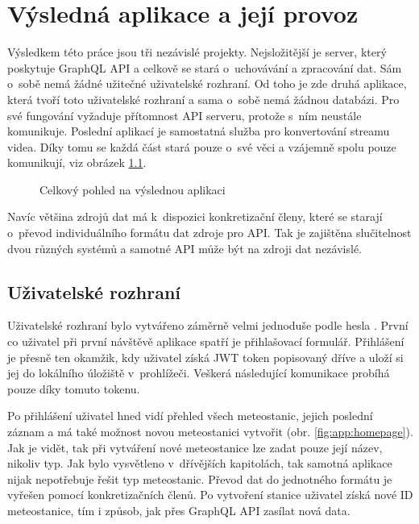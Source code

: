 \chapter{Výsledná aplikace a její provoz}
Výsledkem této práce jsou tři nezávislé projekty. Nejsložitější je server, který poskytuje GraphQL API a celkově se stará o~uchovávání a zpracování dat. Sám o~sobě nemá žádné užitečné uživatelské rozhraní. Od toho je zde druhá aplikace, která tvoří toto uživatelské rozhraní a sama o~sobě nemá žádnou databázi. Pro své fungování vyžaduje přítomnost API serveru, protože s~ním neustále komunikuje. Poslední aplikací je samostatná služba pro konvertování streamu videa. Díky tomu se každá část stará pouze o~své věci a vzájemně spolu pouze komunikují, viz obrázek \ref{fig:architecture}.

\begin{figure}[h]
	\centering
	\caption{Celkový pohled na výslednou aplikaci}
	\label{fig:architecture}
\end{figure}

Navíc většina zdrojů dat má k~dispozici konkretizační členy, které se starají o~převod individuálního formátu dat zdroje pro API. Tak je zajištěna slučitelnost dvou různých systémů a samotné API může být na zdroji dat nezávislé.


\section{Uživatelské rozhraní}
Uživatelské rozhraní bylo vytvářeno záměrně velmi jednoduše podle hesla . První co uživatel při první návštěvě aplikace spatří je přihlašovací formulář. Přihlášení je přesně ten okamžik, kdy uživatel získá JWT token popisovaný dříve a uloží si jej do lokálního úložiště v~prohlížeči. Veškerá následující komunikace probíhá pouze díky tomuto tokenu.


Po přihlášení uživatel hned vidí přehled všech meteostanic, jejich poslední záznam a má také možnost novou meteostanici vytvořit (obr. \ref{fig:app:homepage}). Jak je vidět, tak při vytváření nové meteostanice lze zadat pouze její název, nikoliv typ. Jak bylo vysvětleno v~dřívějších kapitolách, tak samotná aplikace nijak nepotřebuje řešit typ meteostanic. Převod dat do jednotného formátu je vyřešen pomocí konkretizačních členů. Po vytvoření stanice uživatel získá nové ID meteostanice, tím i způsob, jak přes GraphQL API zasílat nová data.

